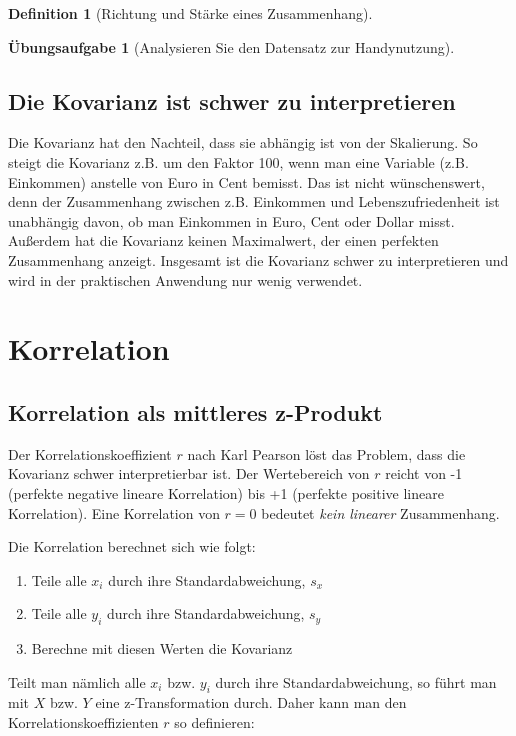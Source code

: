 \documentclass[
  a4paper,
  DIV=11]{scrreprt}
\providecommand{\tightlist}{%
  \setlength{\itemsep}{0pt}\setlength{\parskip}{0pt}}\usepackage{longtable,booktabs,array}
\theoremstyle{definition}
\newtheorem{exercise}{Übungsaufgabe}[chapter]
\theoremstyle{definition}
\theoremstyle{definition}
\newtheorem{definition}{Definition}[chapter]
\theoremstyle{remark}
\begin{document}
\begin{definition}[Richtung und Stärke eines
Zusammenhang]
\begin{exercise}[Analysieren Sie den Datensatz zur
Handynutzung]
\begin{figure}
\end{figure}%

\subsection{Die Kovarianz ist schwer zu
interpretieren}\label{die-kovarianz-ist-schwer-zu-interpretieren}

Die Kovarianz hat den Nachteil, dass sie abhängig ist von der
Skalierung. So steigt die Kovarianz z.B. um den Faktor 100, wenn man
eine Variable (z.B. Einkommen) anstelle von Euro in Cent bemisst. Das
ist nicht wünschenswert, denn der Zusammenhang zwischen z.B. Einkommen
und Lebenszufriedenheit ist unabhängig davon, ob man Einkommen in Euro,
Cent oder Dollar misst. Außerdem hat die Kovarianz keinen Maximalwert,
der einen perfekten Zusammenhang anzeigt. Insgesamt ist die Kovarianz
schwer zu interpretieren und wird in der praktischen Anwendung nur wenig
verwendet.

\section{Korrelation}\label{korrelation}

\subsection{Korrelation als mittleres
z-Produkt}\label{korrelation-als-mittleres-z-produkt}

Der Korrelationskoeffizient \(r\) nach Karl Pearson löst das Problem,
dass die Kovarianz schwer interpretierbar ist. Der Wertebereich von
\(r\) reicht von -1 (perfekte negative lineare Korrelation) bis +1
(perfekte positive lineare Korrelation). Eine Korrelation von \(r = 0\)
bedeutet \emph{kein linearer} Zusammenhang.

Die Korrelation berechnet sich wie folgt:

\begin{enumerate}
\def\labelenumi{\arabic{enumi}.}
\tightlist
\item
  Teile alle \(x_i\) durch ihre Standardabweichung, \(s_x\)
\item
  Teile alle \(y_i\) durch ihre Standardabweichung, \(s_y\)
\item
  Berechne mit diesen Werten die Kovarianz
\end{enumerate}

Teilt man nämlich alle \(x_i\) bzw. \(y_i\) durch ihre
Standardabweichung, so führt man mit \(X\) bzw. \(Y\) eine
z-Transformation durch. Daher kann man den Korrelationskoeffizienten
\(r\) so definieren:


\end{exercise}
\end{definition}
\end{document}

